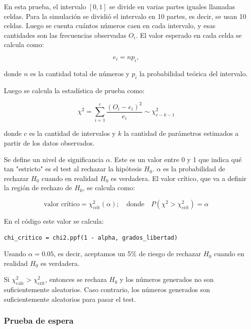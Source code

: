 \documentclass{article}
\begin{document}
En esta prueba, el intervalo $[0,1]$ se divide en varias partes iguales llamadas celdas. Para la simulación se dividió el intervalo en 10 partes, es decir, se usan 10 celdas. Luego se cuenta cuántos números caen en cada intervalo, y esas cantidades son las frecuencias observadas $O_i$. El valor esperado en cada celda se calcula como:

\begin{equation}
  e_i = n p_i,
\end{equation}

donde $n$ es la cantidad total de números y $p_i$ la probabilidad teórica del intervalo.

Luego se calcula la estadística de prueba como:

\begin{equation}
  \chi^2 = \sum_{i=1}^{c} \frac{(O_i - e_i)^2}{e_i}
  \sim \chi^2_{c-k-1}
\end{equation}

donde $c$ es la cantidad de intervalos y $k$ la cantidad de parámetros estimados a partir de los datos observados.

Se define un nivel de significancia $\alpha$. Este es un valor entre 0 y 1 que indica qué tan "estricto" es el test al rechazar la hipótesis $H_0$. $\alpha$ es la probabilidad de rechazar $H_0$ cuando en realidad $H_0$ es verdadera. El valor crítico, que va a definir la región de rechazo de $H_0$, se calcula como:

\begin{equation}
  \text{valor crítico} = \chi^2_{\mathrm{crit}}(\alpha);
\quad \text{donde} \quad
P\!\left(\chi^2 > \chi^2_{\mathrm{crit}}\right)=\alpha
\end{equation}

En el código este valor se calcula:

\begin{verbatim}
chi_critico = chi2.ppf(1 - alpha, grados_libertad)
\end{verbatim}

Usando $\alpha = 0.05$, es decir, aceptamos un 5\% de riesgo de rechazar $H_0$ cuando en realidad $H_0$ es verdadera.

Si $\chi^2_{\text{calc}} > \chi^2_{\text{crit}}$, entonces se rechaza $H_0$ y los números generados no son suficientemente aleatorios. Caso contrario, los números generados son suficientemente aleatorios para pasar el test.

\subsubsection{Prueba de espera}
\end{document}
